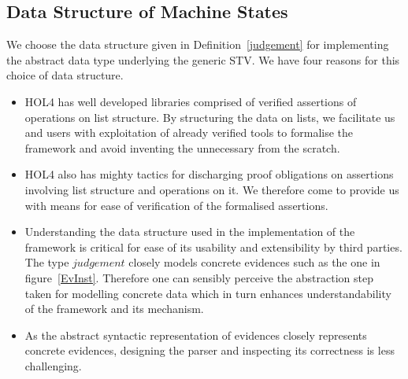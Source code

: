 \documentclass[10pt,conference]{IEEEtran}
\newtheorem{definition}{Definition}
\begin{document}
\subsection{Data Structure of Machine States}
\label{MachineData}
 We choose the data structure  given in Definition~\ref{judgement} for implementing the abstract data type underlying the generic STV.  We have four reasons for this choice of data structure. 
 \begin{itemize}
 \item HOL4 has well developed libraries comprised of verified assertions of operations on list structure. By structuring the data on lists, we facilitate us and users  with exploitation of  already verified tools to formalise the framework and avoid inventing the unnecessary from the scratch. 
 \item HOL4 also has mighty tactics for discharging proof obligations on assertions involving list structure and operations on it. We therefore come to provide us with means for ease of verification of the formalised assertions.
 \item Understanding the data structure used in the  implementation of the framework is critical for ease of  its usability and extensibility by third parties.  The type $\mathit{judgement}$ closely models concrete evidences such as the one in figure~\ref{EvInst}. Therefore one can sensibly perceive the  abstraction step taken for modelling  concrete data which in turn enhances understandability of the framework and its mechanism.  
 \item As the abstract syntactic representation of evidences closely represents concrete evidences, designing the parser and inspecting  its  correctness is less challenging.  
   \end{itemize}
\end{document}
